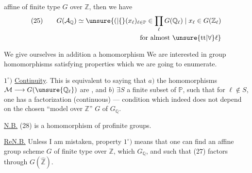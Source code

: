 
affine of finite type \(G\) over \(\mathbb{Z}\), then we have
\[
\begin{gathered}
(25)\qquad G(\mathcal{A}_{\mathbb{Q}})\simeq
\unsure{(|\{}(x_{\ell})_{\ell\in\mathbb{P}}\in\prod_{\ell}G(\mathbb{Q}_{\ell})
\mid x_{\ell}\in G(\mathbb{Z}_{\ell})\\
\hfill\text{for almost }\unsure{\mathrm{tt}|\forall}\ell\}
\end{gathered}
\]


We give ourselves in addition a homomorphism
We are interested in  group homomorphisms
satisfying properties which we are going to enumerate.

\(1^\circ)\) \uline{Continuity}. This is equivalent to saying that \(a)\) the homomorphisms \(\mathcal{M}\longrightarrow G(\unsure{\mathbb{Q}_{\ell}})\) are , and \(b)\) \(\exists S\) a finite subset of \(\mathbb{P}\), such that for \(\ell\notin S\), one has  a factorization (continuous)
--- condition which indeed does not depend on the chosen ``model over \(\mathbb{Z}\)'' \(G\) of \(G_{\mathbb{Q}}\).

\uline{N.B.} (28) is a homomorphism of profinite groups.


\uline{ReN.B.} Unless I am mistaken, property \(1^\circ)\) means that one can find an affine group scheme \(G\) of finite type over \(\mathbb{Z}\), which  \(G_{\mathbb{Q}}\), and such that (27) factors through \(G(\widehat{\mathbb{Z}})\).

